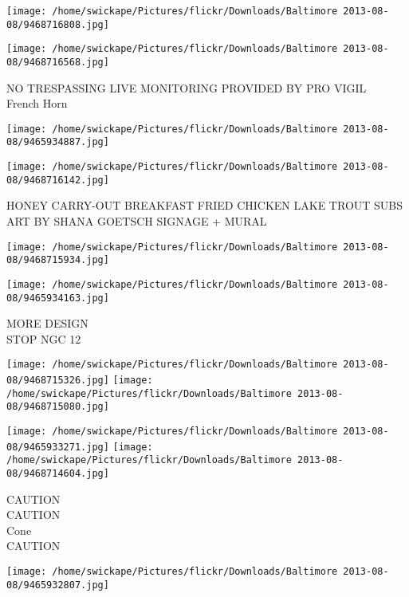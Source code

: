 \documentclass[10pt,letterpaper]{article}
\begin{document}
\texttt{[image: /home/swickape/Pictures/flickr/Downloads/Baltimore 2013-08-08/9468716808.jpg]}

\vspace{0.25in}
\texttt{[image: /home/swickape/Pictures/flickr/Downloads/Baltimore 2013-08-08/9468716568.jpg]}

NO TRESPASSING LIVE MONITORING PROVIDED BY PRO VIGIL\\
French Horn\\
\pagebreak

\texttt{[image: /home/swickape/Pictures/flickr/Downloads/Baltimore 2013-08-08/9465934887.jpg]}

\vspace{0.25in}
\texttt{[image: /home/swickape/Pictures/flickr/Downloads/Baltimore 2013-08-08/9468716142.jpg]}

HONEY CARRY{-}OUT BREAKFAST FRIED CHICKEN LAKE TROUT SUBS\\
ART BY SHANA GOETSCH SIGNAGE + MURAL\\
\pagebreak

\texttt{[image: /home/swickape/Pictures/flickr/Downloads/Baltimore 2013-08-08/9468715934.jpg]}

\vspace{0.25in}
\texttt{[image: /home/swickape/Pictures/flickr/Downloads/Baltimore 2013-08-08/9465934163.jpg]}

MORE DESIGN\\
STOP NGC 12\\
\pagebreak

\texttt{[image: /home/swickape/Pictures/flickr/Downloads/Baltimore 2013-08-08/9468715326.jpg]}
\texttt{[image: /home/swickape/Pictures/flickr/Downloads/Baltimore 2013-08-08/9468715080.jpg]}

\texttt{[image: /home/swickape/Pictures/flickr/Downloads/Baltimore 2013-08-08/9465933271.jpg]}
\texttt{[image: /home/swickape/Pictures/flickr/Downloads/Baltimore 2013-08-08/9468714604.jpg]}

CAUTION\\
CAUTION\\
Cone\\
CAUTION\\
\pagebreak

\texttt{[image: /home/swickape/Pictures/flickr/Downloads/Baltimore 2013-08-08/9465932807.jpg]}
\end{document}

